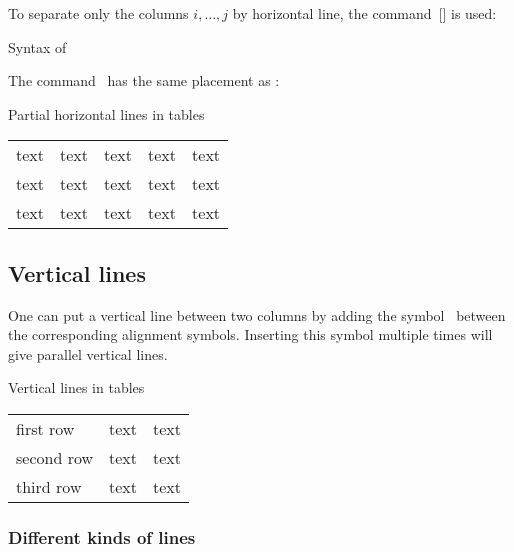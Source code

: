 To separate only the columns $i, \dotsc, j$ by horizontal line, the command~[\comname] is used:
\begin{showcode}{Syntax of }
\end{showcode}
The command~ has the same placement as :
\begin{showlatex}{Partial horizontal lines in tables}
\begin{center}
\begin{tabular}{ccccc}
  text & text & text & text & text \\
  \cline{2-4}
  text & text & text & text & text \\
  \cline{1-2} \cline{4-5}
  text & text & text & text & text
\end{tabular}
\end{center}
\end{showlatex}

\subsection{Vertical lines}

One can put a vertical line between two columns by adding the symbol~\optname{|} between the corresponding alignment symbols.
Inserting this symbol multiple times will give parallel vertical lines.
\begin{showlatex}{Vertical lines in tables}
\begin{tabular}{l||c|c}
  first row   & text & text \\
  second row  & text & text \\
  third row   & text & text
\end{tabular}
\end{showlatex}

\subsubsection{Different kinds of lines}

